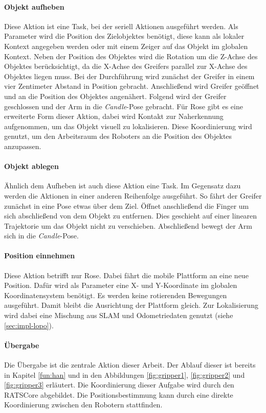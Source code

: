 \paragraph{Objekt aufheben} Diese Aktion ist eine Task, bei der seriell Aktionen ausgeführt werden. Als Parameter wird die Position des Zielobjektes benötigt, diese kann als lokaler Kontext angegeben werden oder mit einem Zeiger auf das Objekt im globalen Kontext. Neben der Position des Objektes wird die Rotation um die Z-Achse des Objektes berücksichtigt, da die X-Achse des Greifers parallel zur X-Achse des Objektes liegen muss. Bei der Durchführung wird zunächst der Greifer in einem vier Zentimeter Abstand in Position gebracht. Anschließend wird Greifer geöffnet und an die Position des Objektes angenähert. Folgend wird der Greifer geschlossen und der Arm in die \textit{Candle}-Pose gebracht. Für Rose gibt es eine erweiterte Form dieser Aktion, dabei wird Kontakt zur Naherkennung aufgenommen, um das Objekt visuell zu lokalisieren. Diese Koordinierung wird genutzt, um den Arbeitsraum des Roboters an die Position des Objektes anzupassen.

\paragraph{Objekt ablegen} Ähnlich dem Aufheben ist auch diese Aktion eine Task. Im Gegensatz dazu werden die Aktionen in einer anderen Reihenfolge ausgeführt. So fährt der Greifer zunächst in eine Pose etwas über dem Ziel. Öffnet anschließend die Finger um sich abschließend von dem Objekt zu entfernen. Dies geschieht auf einer linearen Trajektorie um das Objekt nicht zu verschieben. Abschließend bewegt der Arm sich in die \textit{Candle}-Pose.

\paragraph{Position einnehmen}
Diese Aktion betrifft nur Rose. Dabei fährt die mobile Plattform an eine neue Position. Dafür wird als Parameter eine X- und Y-Koordinate im globalen Koordinatensystem benötigt. Es werden keine rotierenden Bewegungen ausgeführt. Damit bleibt die Ausrichtung der Plattform gleich. Zur Lokalisierung wird dabei eine Mischung aus SLAM und Odometriedaten genutzt (siehe \ref{sec:impl-lopo}).

\paragraph{Übergabe} Die Übergabe ist die zentrale Aktion dieser Arbeit. Der Ablauf dieser ist bereits in Kapitel \ref{fun:han} und in den Abbildungen \ref{fig:gripper1}, \ref{fig:gripper2} und \ref{fig:gripper3} erläutert. Die Koordinierung dieser Aufgabe wird durch den RATSCore abgebildet. Die Positionsbestimmung kann durch eine direkte Koordinierung zwischen den Robotern stattfinden.

